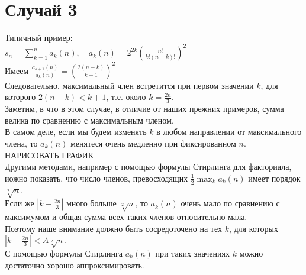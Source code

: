 \documentclass{report}
\begin{document}
\section{Случай 3}
Типичный пример: \\
$s_n=\sum_{k=1}^{n}a_k(n),\quad a_k(n)=2^{2k}\left(\frac{n!}{k!(n-k)!}\right)^2$ \\
Имеем $\frac{a_{k+1}(n)}{a_k(n)}=\left(\frac{2(n-k)}{k+1}\right)^2$ \\
Следовательно, максимальный член встретится при первом значении $k$, для которого $2(n-k)<k+1$, т.е. около $k=\frac{2n}{3}$. \\
Заметим, в что в этом случае, в отличие от наших прежних примеров, сумма велика по сравнению с максимальным членом. \\
В самом деле, если мы будем изменять $k$ в любом направлении от максимального члена, то $a_k(n)$ менятеся очень медленно при фиксированном $n$. \\
НАРИСОВАТЬ ГРАФИК\\
Другими методами, например с помощью формулы Стирлинга для факториала, иожно показать, что число членов, превосходящих $\frac{1}{2}\max_k{a_k(n)}$ имеет порядок $\sqrt[2]{n}$.\\
Если же $|k-\frac{2n}{3}|$ много больше $\sqrt[2]{n}$, то $a_k(n)$ очень мало по сравнению с максимумом и общая сумма всех таких членов относительно мала. \\
Поэтому наше внимание должно быть сосредоточено на тех $k$, для которых $|k-\frac{2n}{3}|<A\sqrt[2]{n}$. \\
С помощью формулы Стирлинга $a_k(n)$ при таких значениях $k$ можно достаточно хорошо аппроксимировать. \\
\newpage
\end{document}
